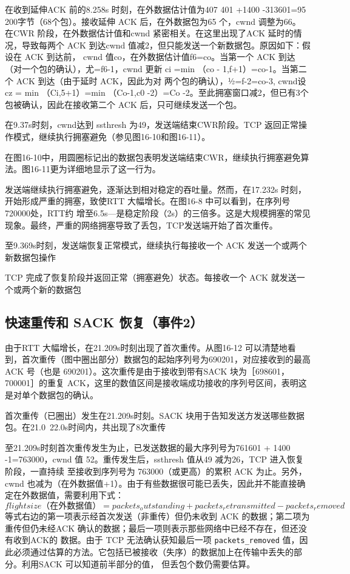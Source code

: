 在收到延伸ACK 前的8.258s 时刻，在外数据估计值为407 401 +1400 -313601=95 200字节（68个包）。接收延伸 ACK 后，在外数据包为65 个，cwnd 调整为66。
在CWR 阶段，在外数据估计值和cwnd 紧密相关。在这里出现了ACK 延时的情况，导致每两个 ACK 到达cwnd 值减2，但只能发送一个新数据包。原因如下：假设在 ACK 到达前，
cwnd 值co，在外数据估计值f6=co。当第一个 ACK 到达（对一个包的确认），尤=f6-1，cwnd 更新 ci =min （co - 1,f+1）=co-1。当第二个 ACK 到达（由于延时 ACK，因此为对
两个包的确认），½=f-2=co-3, cwnd设 cz = min （Ci,5+1）=min （Co-1,c0 -2）=Co -2。至此拥塞窗口减2，但已有3个包被确认，因此在接收第二个 ACK 后，只可继续发送一个包。

在9.37s时刻，cwnd达到 ssthresh 为49，发送端结束CWR阶段。TCP 返回正常操作模式，继续执行拥塞避免（参见图16-10和图16-11）。

在图16-10中，用圆圈标记出的数据包表明发送端结束CWR，继续执行拥塞避免算法。图16-11更为详细地显示了这一行为。

发送端继续执行拥塞避免，逐渐达到相对稳定的吞吐量。然而，在17.232s 时刻，开始形成严重的拥塞，致使RTT 大幅增长。在图16-8 中可以看到，在序列号 720000处，RTT约
增至6.5s—是稳定阶段（2s）的三倍多。这是大规模拥塞的常见现象。最终，严重的网络拥塞导致了丢包，TCP发送端开始了首次重传。

至9.369s时刻，发送端恢复正常模式，继续执行每接收一个 ACK 发送一个或两个新数据包操作

TCP 完成了恢复阶段并返回正常（拥塞避免）状态。每接收一个 ACK 就发送一个或两个新的数据包

\subsection{快速重传和 SACK 恢复（事件2）}

由于RTT 大幅增长，在21.209s时刻出现了首次重传。从图16-12 可以清楚地看到，首次重传（图中圈出部分）数据包的起始序列号为690201，对应接收到的最高 ACK 号（也是
690201）。这次重传是由于接收到带有SACK 块为［698601，700001］的重复 ACK，这里的数值区间是接收端成功接收的序列号区间，表明这是对单个数据包的确认。

首次重传（已圈出）发生在21.209s时刻。SACK 块用于告知发送方发送哪些数据包。在21.0~22.0s时间内，共出现了8次重传

至21.209s时刻首次重传发生为止，已发送数据的最大序列号为761601 + 1400 -1=763000，cwnd 值 52。重传发生后，ssthresh 值从49 减为26，TCP 进入恢复阶段，一直持续
至接收到序列号为 763000（或更高）的累积 ACK 为止。另外，cwnd 也减为（在外数据值+1）。由于有些数据很可能已丢失，因此并不能直接确定在外数据值，需要利用下式：
\begin{equation}
    flight size（在外数据值）=packets_outstanding + packets_retransmitted - packets_removed
\end{equation}
等式右边的第一项表示经首次发送（非重传）但仍未收到 ACK 的数据；第二项为重传但仍未经ACK 确认的数据；最后一项则表示那些网络中已经不存在，但还没有收到ACK的
数据。由于 TCP 无法确认获知最后一项 \verb|packets_removed| 值，因此必须通过估算的方法。它包括已被接收（失序）的数据加上在传输中丢失的部分。利用SACK 可以知道前半部分的值，
但丢包个数仍需要估算。

